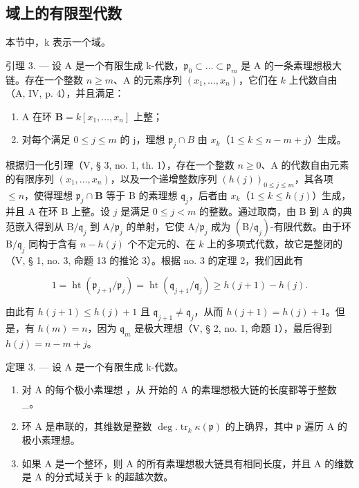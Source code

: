 \subsection{域上的有限型代数}

本节中，k 表示一个域。

引理 3. --- 设 A 是一个有限生成 k-代数，\(\mathfrak{p}_{0} \subset \ldots \subset \mathfrak{p}_{m}\) 是 A 的一条素理想极大链。存在一个整数 \(n \geqslant m\)、A 的元素序列 \((x_{1}, \ldots, x_{n})\)，它们在 \(k\) 上代数自由（A, IV, p. 4），并且满足：

\begin{enumerate}
\def\labelenumi{\alph{enumi})}
\item
  A 在环 \(\mathbf{B} = k[x_1, \ldots, x_n]\) 上整；
\item
  对每个满足 \(0 \leqslant j \leqslant m\) 的 j，理想 \(\mathfrak{p}_{j} \cap B\) 由 \(x_{k}\)（\(1 \leqslant k \leqslant n - m + j\)）生成。
\end{enumerate}

根据归一化引理（V, § 3, no. 1, th. 1），存在一个整数 \(n \geqslant 0\)、A 的代数自由元素的有限序列 \((x_1, ..., x_n)\)，以及一个递增整数序列 \((h(j))_{0 \leqslant j \leqslant m}\)，其各项 \(\leqslant n\)，使得理想 \(\mathfrak{p}_j \cap \mathbf{B}\) 等于 B 的素理想 \(\mathfrak{q}_j\)，后者由 \(x_k\)（\(1 \leqslant k \leqslant h(j)\)）生成，并且 A 在环 B 上整。设 \(j\) 是满足 \(0 \leqslant j < m\) 的整数。通过取商，由 B 到 A 的典范嵌入得到从 \(\mathrm{B} / \mathfrak{q}_j\) 到 \(\mathrm{A} / \mathfrak{p}_j\) 的单射，它使 \(\mathrm{A} / \mathfrak{p}_j\) 成为 \((\mathrm{B} / \mathfrak{q}_j)\)-有限代数。由于环 \(\mathrm{B} / \mathfrak{q}_j\) 同构于含有 \(n - h(j)\) 个不定元的、在 \(k\) 上的多项式代数，故它是整闭的（V, § 1, no. 3, 命题 13 的推论 3）。根据 no. 3 的定理 2，我们因此有

\[
1 = \operatorname{ht} \left(\mathfrak {p} _ {j + 1} / \mathfrak {p} _ {j}\right) = \operatorname{ht} \left(\mathfrak {q} _ {j + 1} / \mathfrak {q} _ {j}\right) \geqslant h (j + 1) - h (j).
\]

由此有 \(h(j + 1) \leqslant h(j) + 1\) 且 \(\mathfrak{q}_{j+1} \neq \mathfrak{q}_j\)，从而 \(h(j + 1) = h(j) + 1\)。但是，有 \(h(m) = n\)，因为 \(\mathfrak{q}_m\) 是极大理想（V, § 2, no. 1, 命题 1），最后得到 \(h(j) = n - m + j\)。

定理 3. — 设 A 是一个有限生成 k-代数。

\begin{enumerate}
\def\labelenumi{\alph{enumi})}
\item
  对 A 的每个极小素理想  ，从  开始的 A 的素理想极大链的长度都等于整数 \_。
\item
  环 A 是串联的，其维数是整数 \(\deg. \operatorname{tr}_{k}\kappa(\mathfrak{p})\) 的上确界，其中 \(\mathfrak{p}\) 遍历 A 的极小素理想。
\item
  如果 A 是一个整环，则 A 的所有素理想极大链具有相同长度，并且 A 的维数是 A 的分式域关于 k 的超越次数。
\end{enumerate}

